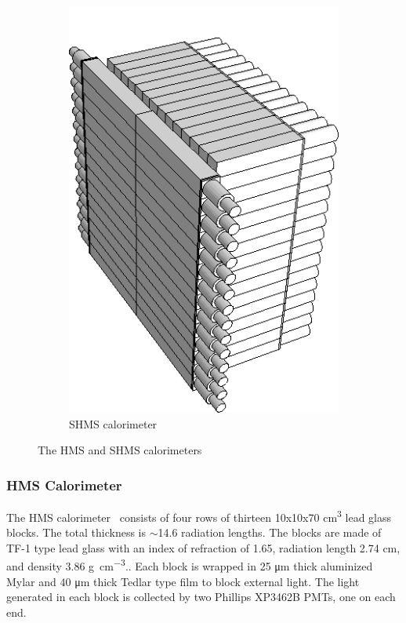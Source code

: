 \begin{figure}[ht]
\begin{subfigure}[b]{0.35\textwidth}
        \includegraphics[width=\textwidth]{chap3/shms_calorimeter_drawing.png}
        \caption{SHMS calorimeter}
        \label{fig:shms_calorimeter}
    \end{subfigure}
    \caption{The HMS and SHMS calorimeters}
    \label{fig:calorimeters}
\end{figure}

\subsubsection{HMS Calorimeter}
The HMS calorimeter~\cite{Mkrtchyan_2012} consists of four rows of thirteen
10x10x70 \si{\cm\cubed} lead glass blocks.
The total thickness is $\sim$14.6 radiation lengths.
The blocks are made of TF-1 type lead glass with an index of refraction of
1.65, radiation length 2.74 \si{cm}, and density 3.86 \si{\gram\per\cm\cubed}..
Each block is wrapped in 25 \si{\um} thick aluminized Mylar and 40
\si{\um} thick Tedlar type film to block external light.
The light generated in each block is collected by two Phillips XP3462B PMTs,
one on each end.

